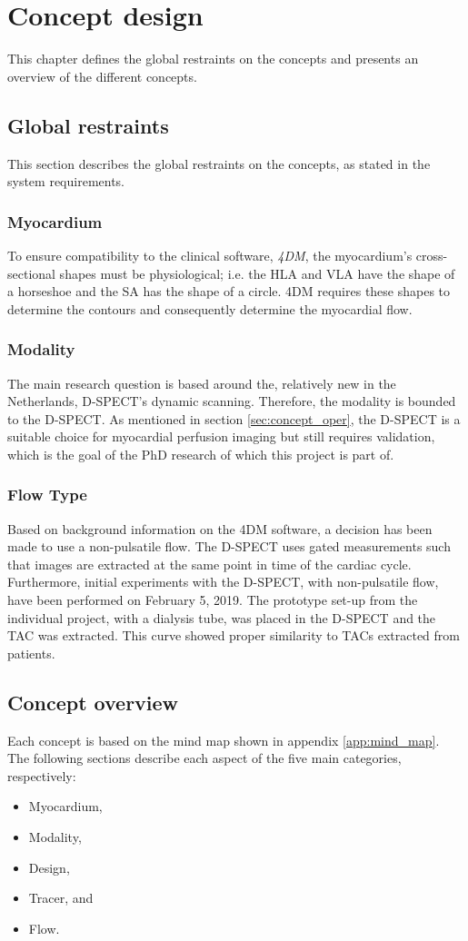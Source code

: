 \chapter{Concept design}
This chapter defines the global restraints on the concepts and presents an overview of the different concepts.

\section{Global restraints}
This section describes the global restraints on the concepts, as stated in the system requirements. 
\subsection{Myocardium}
\label{sec:myocardium}
To ensure compatibility to the clinical software, \textit{4DM}, the myocardium's cross-sectional shapes must be physiological; i.e. the \ac{HLA} and \ac{VLA} have the shape of a horseshoe and the \ac{SA} has the shape of a circle. 4DM requires these shapes to determine the contours and consequently determine the myocardial flow.
\subsection{Modality}
\label{sec:modality}
The main research question is based around the, relatively new in the Netherlands, D-SPECT's dynamic scanning. Therefore, the modality is bounded to the D-SPECT. As mentioned in section \ref{sec:concept_oper}, the D-SPECT is a suitable choice for myocardial perfusion imaging but still requires validation, which is the goal of the PhD research of which this project is part of.
\subsection{Flow Type}
Based on background information on the 4DM software, a decision has been made to use a non-pulsatile flow. The D-SPECT uses gated measurements such that images are extracted at the same point in time of the cardiac cycle. Furthermore, initial experiments with the D-SPECT, with non-pulsatile flow, have been performed on February 5, 2019. The prototype set-up from the individual project, with a dialysis tube, was placed in the D-SPECT and the TAC was extracted. This curve showed proper similarity to TACs extracted from patients.
\section{Concept overview}
Each concept is based on the mind map shown in appendix \ref{app:mind_map}. The following sections describe each aspect of the five main categories, respectively:
\begin{itemize}[noitemsep]
	\item Myocardium,
	\item Modality,
	\item Design,
	\item Tracer, and
	\item Flow.
\end{itemize}
